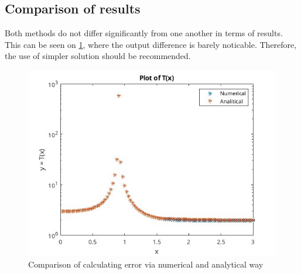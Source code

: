 \subsection{Comparison of results}
Both methods do not differ significantly from one another in terms of results.
This can be seen on \ref{fig:task1}, where the output difference is barely
noticable. Therefore, the use of simpler solution should be recommended.
\begin{figure}[ht]
    \begin{center}
        \includegraphics[width=\textwidth]{Task1.jpg}
    \end{center}
    \caption{Comparison of calculating error via numerical and analytical way}
    \label{fig:task1}
\end{figure}
